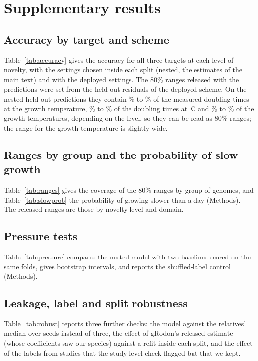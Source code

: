 \section{Supplementary results}

\subsection{Accuracy by target and scheme}
Table~\ref{tab:accuracy} gives the accuracy for all three targets at each level of novelty, with the settings chosen inside
each split (nested, the estimates of the main text) and with the deployed settings. The 80\% ranges released with the
predictions were set from the held-out residuals of the deployed scheme. On the nested held-out predictions they contain
\CoverSameGenus\% to \CoverNewOrder\% of the measured doubling times at the growth temperature, \CoverRefMin\% to
\CoverRefMax\% of the doubling times at \TRefC\,\textdegree C and \CoverTempMin\% to \CoverTempMax\% of the growth
temperatures, depending on the level, so they can be read as 80\% ranges; the range for the growth temperature is
slightly wide.



\subsection{Ranges by group and the probability of slow growth}
Table~\ref{tab:ranges} gives the coverage of the 80\% ranges by group of genomes, and Table~\ref{tab:slowprob} the
probability of growing slower than a day (Methods). The released ranges are those by novelty level and domain.



\subsection{Pressure tests}
Table~\ref{tab:pressure} compares the nested model with two baselines scored on the same folds, gives bootstrap intervals,
and reports the shuffled-label control (Methods).



\subsection{Leakage, label and split robustness}
Table~\ref{tab:robust} reports three further checks: the model against the relatives' median over \TenNSeeds seeds instead
of three, the effect of gRodon's released estimate (whose coefficients saw our species) against a refit inside each split,
and the effect of the labels from studies that the study-level check flagged but that we kept.

